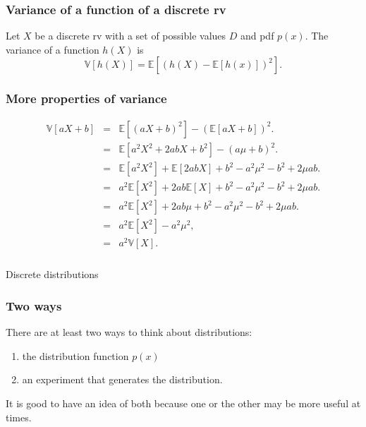 \begin{frame}[fragile]\frametitle{Variance of a function of a discrete rv}

\begin{prop}
Let $X$ be a discrete rv with a set of possible values $D$ and pdf
$p(x)$. The variance of a function $h(X)$ is
$$\mathbb V[h(X)] = \mathbb E[(h(X)- \mathbb E[h(x)])^2].$$
\end{prop}

\end{frame}


\begin{frame}[fragile]\frametitle{More properties of variance}

\begin{eqnarray*}
\mathbb V[aX+b] &=& \mathbb E[(aX+b)^2]- (\mathbb E[aX+b])^2. \\ 
          &=& \mathbb E[a^2 X^2+ 2ab X +  b^2] - (a \mu+b)^2. \\ 
          &=& \mathbb E[a^2 X^2] + \mathbb E[2ab X] +  b^2 - a^2 \mu^2 - b^2 + 2 \mu ab. \\ 
          &=& a^2 \mathbb E[X^2] + 2 ab \mathbb E[X] + b^2 - a^2 \mu^2 - b^2 + 2 \mu ab. \\ 
          &=& a^2 \mathbb E[X^2] + 2 ab \mu + b^2 - a^2 \mu^2 - b^2 + 2 \mu ab. \\ 
          &=& a^2 \mathbb E[X^2] -a^2 \mu^2, \\ 
          & = & a^2 \mathbb V[X].
\end{eqnarray*}


\end{frame}


\begin{frame}[fragile]\frametitle{}
\begin{center}
{\Large Discrete distributions}

\end{center}
\end{frame}


\begin{frame}[fragile]\frametitle{Two ways}

There are at least two ways to think about distributions: 
\begin{enumerate} 

\item the distribution function $p(x)$ 

\item an experiment that generates the distribution. 

\end{enumerate}

It is good to have an idea of both because one or the other
may be more useful at times.

\end{frame}


